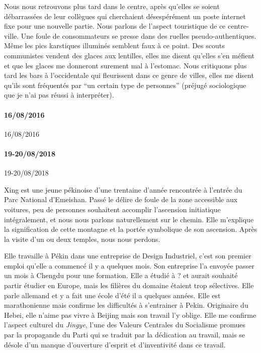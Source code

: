 Nous nous retrouvons plus tard dans le centre, après qu'elles se soient débarrassées de leur collègues qui cherchaient désespérément un poste internet fixe pour une nouvelle partie. Nous parlons de l'aspect touristique de ce centre-ville. Une foule de consommateurs se presse dans des ruelles pseudo-authentiques. Même les pics karstiques illuminés semblent faux à ce point. Des scouts communistes vendent des glaces aux lentilles, elles me disent qu'elles s'en méfient et que les glaces me donneront surement mal à l'estomac. Nous critiquons plus tard les bars à l'occidentale qui fleurissent dans ce genre de villes, elles me disent qu'ils sont fréquentés par ``un certain type de personnes'' (préjugé sociologique que je n'ai pas réussi à interpréter).


\paragraph{16/08/2016}{16/08/2016}




\paragraph{19-20/08/2018}{19-20/08/2018}


Xing est une jeune pékinoise d'une trentaine d'année rencontrée à l'entrée du Parc National d'Emeishan. Passé le délire de foule de la zone accessible aux voitures, peu de personnes souhaitent accomplir l'ascension initiatique intégralement, et nous nous parlons naturellement sur le chemin. Elle m'explique la signification de cette montagne et la portée symbolique de son ascension. Après la visite d'un ou deux temples, nous nous perdons.

Elle travaille à Pékin dans une entreprise de Design Industriel, c'est son premier emploi qu'elle a commencé il y a quelques mois. Son entreprise l'a envoyée passer un mois à Chengdu pour une formation. Elle a étudié à ? et aurait souhaité partir étudier en Europe, mais les filières du domaine étaient trop sélectives. Elle parle allemand et y a fait une école d'été il a quelques années. Elle est marathonienne mais confirme les difficultés à s'entrainer à Pekin. Originaire du Hebei, elle n'aime pas vivre à Beijing mais son travail l'y oblige. Elle me confirme l'aspect culturel du \emph{Jingye}, l'une des Valeurs Centrales du Socialisme promues par la propagande du Parti qui se traduit par la dédication au travail, mais se désole d'un manque d'ouverture d'esprit et d'inventivité dans ce travail.

